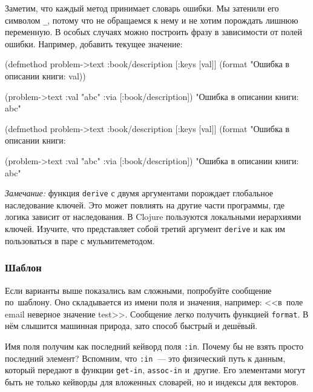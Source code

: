 \fi


Заметим, что каждый метод принимает словарь ошибки. Мы затенили его символом
\verb|_|, потому что не обращаемся к нему и не хотим порождать лишнюю
переменную. В особых случаях можно построить фразу в зависимости от полей
ошибки. Например, добавить текущее значение:

\ifx\DEVICETYPE\MOBILE

  \begin{clojure}
(defmethod problem->text
  :book/description
  [{:keys [val]}]
  (format "Ошибка в описании книги: %
    val))

(problem->text
  {:val "abc" :via [:book/description]})
"Ошибка в описании книги: abc"
  \end{clojure}

\else

  \begin{clojure}
(defmethod problem->text :book/description
  [{:keys [val]}]
  (format "Ошибка в описании книги: %

(problem->text {:val "abc" :via [:book/description]})
"Ошибка в описании книги: abc"
  \end{clojure}

\fi

\emph{Замечание:} функция \verb|derive| с двумя аргументами порождает
глобальное наследование ключей. Это может повлиять на другие части программы,
где логика зависит от наследования. В Clojure пользуются локальными иерархиями
ключей. Изучите, что представляет собой третий аргумент \verb|derive| и как им
пользоваться в паре с мульмитеметодом.

\subsubsection{Шаблон}


Если варианты выше показались вам сложными, попробуйте сообщение по~шаблону. Оно
складывается из имени поля и значения, например: <<в~поле email неверное
значение test>>. Сообщение легко получить функцией \verb|format|. В нём
слышится машинная природа, зато способ быстрый и дешёвый.

Имя поля получим как последний кейворд поля \verb|:in|. Почему бы не взять
просто последний элемент? Вспомним, что \verb|:in|~--- это физический путь к данным,
который передают в функции \verb|get-in|, \verb|assoc-in| и~другие. Его
элементами могут быть не только кейворды для вложенных словарей, но и индексы
для векторов.


